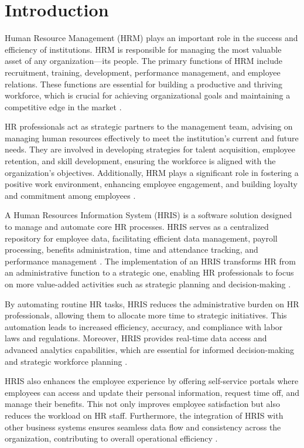 \chapter{Introduction}
Human Resource Management (HRM) plays an important role in the success and efficiency of institutions. HRM is responsible for managing the most valuable asset of any organization—its people. The primary functions of HRM include recruitment, training, development, performance management, and employee relations. These functions are essential for building a productive and thriving workforce, which is crucial for achieving organizational goals and maintaining a competitive edge in the market \cite{a12019,t12020}.

HR professionals act as strategic partners to the management team, advising on managing human resources effectively to meet the institution's current and future needs. They are involved in developing strategies for talent acquisition, employee retention, and skill development, ensuring the workforce is aligned with the organization's objectives. Additionally, HRM plays a significant role in fostering a positive work environment, enhancing employee engagement, and building loyalty and commitment among employees \cite{b12021,d12022}.

A Human Resources Information System (HRIS) is a software solution designed to manage and automate core HR processes. HRIS serves as a centralized repository for employee data, facilitating efficient data management, payroll processing, benefits administration, time and attendance tracking, and performance management \cite{m22024,o12023}. The implementation of an HRIS transforms HR from an administrative function to a strategic one, enabling HR professionals to focus on more value-added activities such as strategic planning and decision-making \cite{n12023}.

By automating routine HR tasks, HRIS reduces the administrative burden on HR professionals, allowing them to allocate more time to strategic initiatives. This automation leads to increased efficiency, accuracy, and compliance with labor laws and regulations. Moreover, HRIS provides real-time data access and advanced analytics capabilities, which are essential for informed decision-making and strategic workforce planning \cite{gym12024,h12022}.

HRIS also enhances the employee experience by offering self-service portals where employees can access and update their personal information, request time off, and manage their benefits. This not only improves employee satisfaction but also reduces the workload on HR staff. Furthermore, the integration of HRIS with other business systems ensures seamless data flow and consistency across the organization, contributing to overall operational efficiency \cite{a22023,s12022}.

